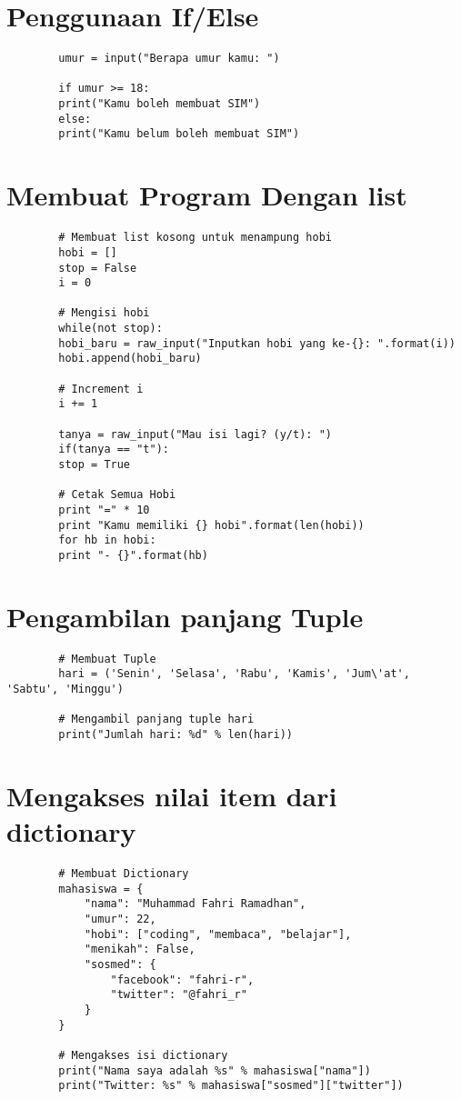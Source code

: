 \documentclass{article}
\begin{document}
	\section{Penggunaan If/Else}
	\begin{lstlisting}
		umur = input("Berapa umur kamu: ")
		
		if umur >= 18:
		print("Kamu boleh membuat SIM")
		else:
		print("Kamu belum boleh membuat SIM")
	\end{lstlisting}

	\section{Membuat Program Dengan list}
	\begin{lstlisting}
		# Membuat list kosong untuk menampung hobi
		hobi = []
		stop = False
		i = 0
		
		# Mengisi hobi
		while(not stop):
		hobi_baru = raw_input("Inputkan hobi yang ke-{}: ".format(i))
		hobi.append(hobi_baru)
		
		# Increment i
		i += 1
		
		tanya = raw_input("Mau isi lagi? (y/t): ")
		if(tanya == "t"): 
		stop = True
		
		# Cetak Semua Hobi
		print "=" * 10 
		print "Kamu memiliki {} hobi".format(len(hobi))
		for hb in hobi:
		print "- {}".format(hb)
	\end{lstlisting}

	\section{Pengambilan panjang Tuple}
	\begin{lstlisting}
		# Membuat Tuple
		hari = ('Senin', 'Selasa', 'Rabu', 'Kamis', 'Jum\'at', 'Sabtu', 'Minggu')
		
		# Mengambil panjang tuple hari
		print("Jumlah hari: %d" % len(hari))
	\end{lstlisting}

	\section{Mengakses nilai item dari dictionary}
	\begin{lstlisting}
		# Membuat Dictionary
		mahasiswa = {
			"nama": "Muhammad Fahri Ramadhan",
			"umur": 22,
			"hobi": ["coding", "membaca", "belajar"],
			"menikah": False,
			"sosmed": {
				"facebook": "fahri-r",
				"twitter": "@fahri_r"
			} 
		}
		
		# Mengakses isi dictionary
		print("Nama saya adalah %s" % mahasiswa["nama"])
		print("Twitter: %s" % mahasiswa["sosmed"]["twitter"])
	\end{lstlisting}
\end{document}
